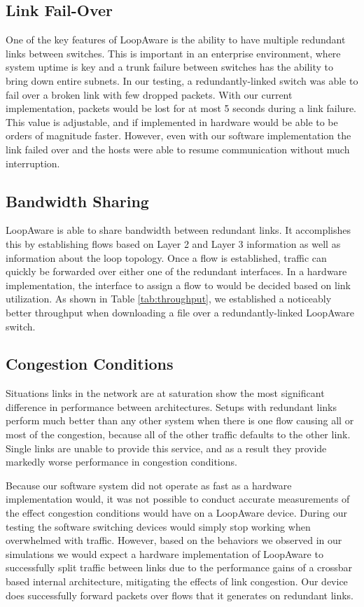     \subsection{Link Fail-Over}
	One of the key features of LoopAware is the ability to have multiple redundant links between switches.
	This is important in an enterprise environment, where system uptime is key and a trunk failure between switches has the ability to bring down entire subnets.
	In our testing, a redundantly-linked switch was able to fail over a broken link with few dropped packets.
	With our current implementation, packets would be lost for at most 5 seconds during a link failure.
	This value is adjustable, and if implemented in hardware would be able to be orders of magnitude faster.
	However, even with our software implementation the link failed over and the hosts were able to resume communication without much interruption.
	
    \subsection{Bandwidth Sharing}
	LoopAware is able to share bandwidth between redundant links.
	It accomplishes this by establishing flows based on Layer 2 and Layer 3 information as well as information about the loop topology.
	Once a flow is established, traffic can quickly be forwarded over either one of the redundant interfaces.
	In a hardware implementation, the interface to assign a flow to would be decided based on link utilization.
	As shown in Table \ref{tab:throughput}, we established a noticeably better throughput when downloading a file over a redundantly-linked LoopAware switch.
	
    \subsection{Congestion Conditions}
	Situations links in the network are at saturation show the most significant difference in performance between architectures.
	Setups with redundant links perform much better than any other system when there is one flow causing all or most of the congestion, because all of  the other traffic defaults to the other link.
	Single links are unable to provide this service, and as a result they provide markedly worse performance in congestion conditions.
    
    Because our software system did not operate as fast as a hardware implementation would, it was not possible to conduct accurate measurements of the effect congestion conditions would have on a LoopAware device.
    During our testing the software switching devices would simply stop working when overwhelmed with traffic.
    However, based on the behaviors we observed in our simulations we would expect a hardware implementation of LoopAware to successfully split traffic between links due to the performance gains of a crossbar based internal architecture, mitigating the effects of link congestion.
    Our device does successfully forward packets over flows that it generates on redundant links.

